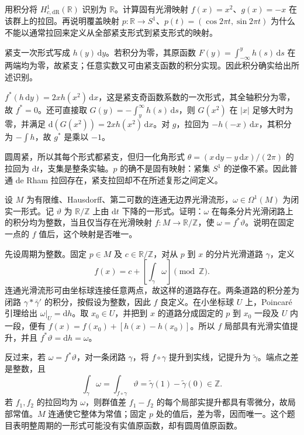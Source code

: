\begin{exercise}\label{g2:ex:proper-pullback-compact-forms}
	用积分将 \(H_{c,\mathrm{dR}}^1(\mathbb R)\) 识别为 \(\mathbb R\)。计算固有光滑映射 \(f(x)=x^2\)、\(g(x)=-x\) 在该群上的拉回。再说明覆盖映射 \(p:\mathbb R\to S^1\)、\(p(t)=(\cos2\pi t,\sin2\pi t)\) 为什么不能以通常拉回来定义从全部紧支形式到紧支形式的映射。
\end{exercise}
\begin{solution}
	紧支一次形式写成 \(h(y)\,\mathrm dy\)。若积分为零，其原函数 \(F(y)=\int_{-\infty}^yh(s)\,\mathrm ds\) 在两端均为零，故紧支；任意实数又可由紧支函数的积分实现。因此积分确实给出所述识别。

	\(f^*(h\,\mathrm dy)=2x h(x^2)\,\mathrm dx\)，这是紧支奇函数系数的一次形式，其全轴积分为零，故 \(f^*=0\)。还可直接取 \(G(y)=-\int_y^\infty h(s)\,\mathrm ds\)，则 \(G(x^2)\) 在 \(|x|\) 足够大时为零，并满足 \(\mathrm d(G(x^2))=2x h(x^2)\,\mathrm dx\)。对 \(g\)，拉回为 \(-h(-x)\,\mathrm dx\)，其积分为 \(-\int h\)，故 \(g^*\) 是乘以 \(-1\)。

	圆周紧，所以其每个形式都紧支，但归一化角形式 \(\theta=(x\,\mathrm dy-y\,\mathrm dx)/(2\pi)\) 的拉回为 \(\mathrm dt\)，支集是整条实轴。\(p\) 的确不是固有映射：紧集 \(S^1\) 的逆像不紧。因此普通 de Rham 拉回存在，紧支拉回却不在所述复形之间定义。
\end{solution}

\begin{exercise}\label{g2:ex:integral-one-form-circle-map}
	设 \(M\) 为有限维、Hausdorff、第二可数的连通无边界光滑流形，\(\omega\in\Omega^1(M)\) 为闭实一形式。记 \(\vartheta\) 为 \(\mathbb R/\mathbb Z\) 上由 \(\mathrm dt\) 下降的一形式。证明：\(\omega\) 在每条分片光滑闭路上的积分均为整数，当且仅当存在光滑映射 \(f:M\to\mathbb R/\mathbb Z\)，使 \(\omega=f^*\vartheta\)。说明在固定一点的 \(f\) 值后，这个映射是否唯一。
\end{exercise}
\begin{solution}
	先设周期为整数。固定 \(p\in M\) 及 \(c\in\mathbb R/\mathbb Z\)，对从 \(p\) 到 \(x\) 的分片光滑道路 \(\gamma\)，定义
	\[
		f(x)=c+\left[\int_\gamma\omega\right]\pmod{\mathbb Z}.
	\]
	连通光滑流形可由坐标球连接任意两点，故这样的道路存在。两条道路的积分差为闭路 \(\gamma*\bar\gamma'\) 的积分，按假设为整数，因此 \(f\) 良定义。在小坐标球 \(U\) 上，Poincaré 引理给出 \(\omega|_U=\mathrm dh\)。取 \(x_0\in U\)，并把到 \(x\) 的道路分成固定的 \(p\) 到 \(x_0\) 一段及 \(U\) 内一段，便有 \(f(x)=f(x_0)+[h(x)-h(x_0)]\)。所以 \(f\) 局部具有光滑实值提升，并且 \(f^*\vartheta=\mathrm dh=\omega\)。

	反过来，若 \(\omega=f^*\vartheta\)，对一条闭路 \(\gamma\)，将 \(f\circ\gamma\) 提升到实线，记提升为 \(\widetilde\gamma\)。端点之差是整数，且
	\[
		\int_\gamma\omega=\int_{f\circ\gamma}\vartheta
		=\widetilde\gamma(1)-\widetilde\gamma(0)\in\mathbb Z.
	\]
	若 \(f_1,f_2\) 的拉回均为 \(\omega\)，则群值差 \(f_1-f_2\) 的每个局部实提升都具有零微分，故局部常值。\(M\) 连通使它整体为常值；固定 \(p\) 处的值后，差为零，因而唯一。这个题目表明整周期的一形式可能没有实值原函数，却有圆周值原函数。
\end{solution}

